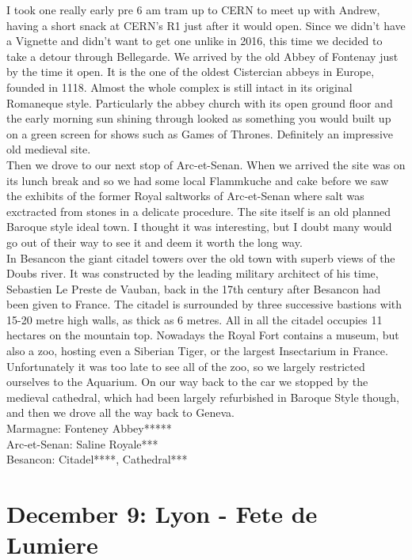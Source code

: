 I took one really early pre 6 am tram up to CERN to meet up with Andrew, having a short snack at CERN's R1 just after it would open. Since we didn't have a Vignette and didn't want to get one unlike in 2016, this time we decided to take a detour through Bellegarde. We arrived by the old Abbey of Fontenay just by the time it open. It is the one of the oldest Cistercian abbeys in Europe, founded in 1118. Almost the whole complex is still intact in its original Romaneque style. Particularly the abbey church with its open ground floor and the early morning sun shining through looked as something you would built up on a green screen for shows such as Games of Thrones. Definitely an impressive old medieval site.\\
 Then we drove to our next stop of Arc-et-Senan. When we arrived the site was on its lunch break and so we had some local Flammkuche and cake before we saw the exhibits of the former Royal saltworks of Arc-et-Senan where salt was exctracted from stones in a delicate procedure. The site itself is an old planned Baroque style ideal town. I thought it was interesting, but I doubt many would go out of their way to see it and deem it worth the long way.\\
 In Besancon the giant citadel towers over the old town with superb views of the Doubs river. It was constructed by the leading military architect of his time, Sebastien Le Preste de Vauban, back in the 17th century after Besancon had been given to France. The citadel is surrounded by three successive bastions with 15-20 metre high walls, as thick as 6 metres. All in all the citadel occupies 11 hectares on the mountain top. Nowadays the Royal Fort contains a museum, but also a zoo, hosting even a Siberian Tiger, or the largest Insectarium in France. Unfortunately it was too late to see all of the zoo, so we largely restricted ourselves to the Aquarium. On our way back to the car we stopped by the medieval cathedral, which had been largely refurbished in Baroque Style though, and then we drove all the way back to Geneva.\\

Marmagne: Fonteney Abbey*****\\
Arc-et-Senan: Saline Royale***\\
Besancon: Citadel****, Cathedral***

\section{December 9: Lyon - Fete de Lumiere}
\label{LumiereLyon2017}


